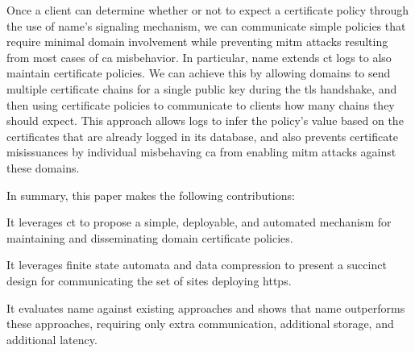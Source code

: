 Once a client can determine whether or not to expect a certificate policy
through the use of \ac{name}'s signaling mechanism, we can communicate simple
policies that require minimal domain involvement while preventing \ac{mitm}
attacks resulting from most cases of \ac{ca} misbehavior. In particular,
\ac{name} extends \ac{ct} logs to also maintain certificate policies. We can
achieve this by allowing domains to send multiple certificate chains for a
single public key during the \ac{tls} handshake, and then using certificate
policies to communicate to clients how many chains they should expect. This
approach allows logs to infer the policy's value based on the certificates that
are already logged in its database, and also prevents certificate misissuances
by individual misbehaving \ac{ca} from enabling \ac{mitm} attacks against these
domains.


In summary, this paper makes the following contributions:
\begin{compactitem}
\item It leverages \ac{ct} to propose a simple, deployable, and automated
  mechanism for maintaining and disseminating domain certificate policies.
\item It leverages finite state automata and data compression to present  a
  succinct design for communicating the set of sites deploying \ac{https}.
\item It evaluates \ac{name} against existing approaches and shows that
  \ac{name} outperforms these approaches, requiring only \steve{} extra
  communication, \steve{} additional storage, and \steve{} additional latency.
\end{compactitem}



